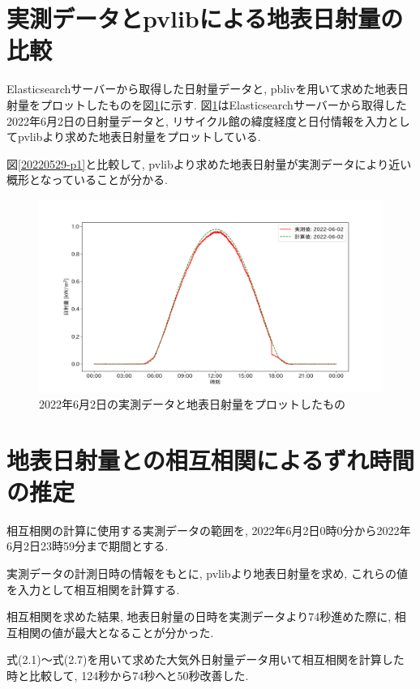 \section{実測データとpvlibによる地表日射量の比較}
Elasticsearchサーバーから取得した日射量データと, pblivを用いて求めた地表日射量をプロットしたものを図\ref{2-p1}に示す.
図\ref{2-p1}はElasticsearchサーバーから取得した2022年6月2日の日射量データと, リサイクル館の緯度経度と日付情報を入力としてpvlibより求めた地表日射量をプロットしている.

図\ref{20220529-p1}と比較して, pvlibより求めた地表日射量が実測データにより近い概形となっていることが分かる.

\begin{figure}[h]
  \begin{center}
    \includegraphics[width=160mm]{sotu/figure/2/pvlib-20220602-corr.png}
    \caption{2022年6月2日の実測データと地表日射量をプロットしたもの}
    \label{2-p1}
  \end{center}
\end{figure}

\section{地表日射量との相互相関によるずれ時間の推定}
相互相関の計算に使用する実測データの範囲を, 2022年6月2日0時0分から2022年6月2日23時59分まで期間とする.

実測データの計測日時の情報をもとに, pvlibより地表日射量を求め, これらの値を入力として相互相関を計算する.

相互相関を求めた結果, 地表日射量の日時を実測データより74秒進めた際に, 相互相関の値が最大となることが分かった.

式(2.1)～式(2.7)を用いて求めた大気外日射量データ用いて相互相関を計算した時と比較して, 124秒から74秒へと50秒改善した.

